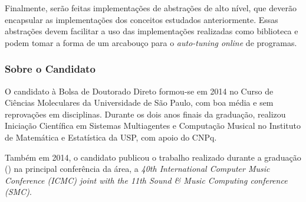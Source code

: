 \documentclass[a4paper, 12pt]{article}
\begin{document}
Finalmente, serão feitas implementações de abstrações de alto
nível, que deverão encapsular as implementações dos conceitos estudados
anteriormente. Essas abstrações devem facilitar a uso das implementações
realizadas como biblioteca e podem tomar a forma de um arcabouço para o
\emph{auto-tuning online} de programas.

\subsubsection{Sobre o Candidato}

O candidato à Bolsa de Doutorado Direto formou-se em 2014 no Curso de Ciências
Moleculares da Universidade de São Paulo, com boa média e sem reprovações em
disciplinas. Durante os dois anos finais da graduação, realizou Iniciação
Científica em Sistemas Multiagentes e Computação Musical no Instituto de
Matemática e Estatística da USP, com apoio do CNPq.

Também em 2014, o candidato publicou o trabalho realizado durante a graduação
(\citet{bruel2014protocol}) na principal conferência da área, a
\emph{40th International Computer Music Conference (ICMC) joint with the
11th Sound \& Music Computing conference (SMC)}.
\end{document}
